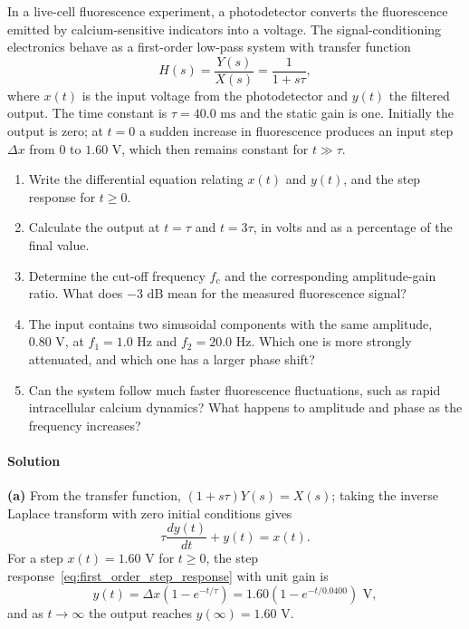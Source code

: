In a live-cell fluorescence experiment, a photodetector converts the fluorescence emitted by calcium-sensitive indicators into a voltage. The signal-conditioning electronics behave as a first-order low-pass system with transfer function
\begin{equation*}
H(s) = \frac{Y(s)}{X(s)} = \frac{1}{1 + s\tau},
\end{equation*}
where $x(t)$ is the input voltage from the photodetector and $y(t)$ the filtered output. The time constant is $\tau = 40.0\text{ ms}$ and the static gain is one. Initially the output is zero; at $t = 0$ a sudden increase in fluorescence produces an input step $\Delta x$ from $0$ to $1.60\text{ V}$, which then remains constant for $t \gg \tau$.
\begin{enumerate}[label=(\alph*)]
    \item Write the differential equation relating $x(t)$ and $y(t)$, and the step response for $t \ge 0$.
    \item Calculate the output at $t = \tau$ and $t = 3\tau$, in volts and as a percentage of the final value.
    \item Determine the cut-off frequency $f_c$ and the corresponding amplitude-gain ratio. What does $-3\text{ dB}$ mean for the measured fluorescence signal?
    \item The input contains two sinusoidal components with the same amplitude, $0.80\text{ V}$, at $f_1 = 1.0\text{ Hz}$ and $f_2 = 20.0\text{ Hz}$. Which one is more strongly attenuated, and which one has a larger phase shift?
    \item Can the system follow much faster fluorescence fluctuations, such as rapid intracellular calcium dynamics? What happens to amplitude and phase as the frequency increases?
\end{enumerate}

\paragraph{Solution} \textbf{(a)} From the transfer function, $(1 + s\tau)Y(s) = X(s)$; taking the inverse Laplace transform with zero initial conditions gives
\begin{equation*}
\tau\frac{dy(t)}{dt} + y(t) = x(t).
\end{equation*}
For a step $x(t) = 1.60\text{ V}$ for $t \ge 0$, the step response~\eqref{eq:first_order_step_response} with unit gain is
\begin{equation*}
y(t) = \Delta x\left(1 - e^{-t/\tau}\right) = 1.60\left(1 - e^{-t/0.0400}\right)\text{ V},
\end{equation*}
and as $t \to \infty$ the output reaches $y(\infty) = 1.60\text{ V}$.

